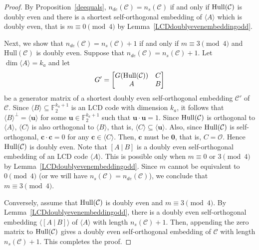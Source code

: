 \documentclass{article}
\theoremstyle{definition}
\theoremstyle{remark}
\begin{document}
\begin{proof}
By Proposition~\ref{deequals}, $n_{de}(\mathcal{C})=n_s(\mathcal{C})$ if and only if ${\rm{Hull}}(\mathcal{C})$ is doubly even and there is a shortest self-orthogonal embedding of $\langle A\rangle$ which is doubly even, that is $m\equiv 0\pmod 4$ by Lemma~\ref{LCDdoublyevenembeddingodd}.

Next, we show that $n_{de}(\mathcal{C})=n_s(\mathcal{C})+1$ if and only if $m\equiv 3\pmod 4$ and $\mathrm{Hull}(\mathcal{C})$ is doubly even. Suppose that $n_{de}(\mathcal{C})=n_s(\mathcal{C})+1$. Let $\dim\langle A\rangle=k_a$ and let
\[
    G'=\begin{bmatrix}G({\rm Hull}(\mathcal{C})) & C\\A & B \end{bmatrix}
\]
be a generator matrix of a shortest doubly even self-orthogonal embedding $\mathcal{C}'$ of $\mathcal{C}$. Since $\langle B\rangle\subseteq\mathbb{F}_2^{k_a+1}$ is an LCD code with dimension $k_a$, it follows that $\langle B\rangle^\perp=\langle \mathbf{u}\rangle$ for some $\mathbf{u}\in\mathbb{F}_2^{k_a+1}$ such that $\mathbf{u}\cdot\mathbf{u}=1$. Since ${\rm Hull}(\mathcal{C})$ is orthogonal to $\langle A\rangle$, $\langle C\rangle$ is also orthogonal to $\langle B\rangle$, that is, $\langle C\rangle\subseteq \langle \mathbf{u}\rangle$. Also, since ${\rm Hull}(\mathcal{C})$ is self-orthogonal, $\mathbf{c}\cdot\mathbf{c}=0$ for any $\mathbf{c}\in\langle C\rangle$. Then, $\mathbf{c}$ must be $\mathbf{0}$, that is, $C=\mathcal{O}$. Hence ${\rm Hull}(\mathcal{C})$ is doubly even. Note that $[A~|~B]$ is a doubly even self-orthogonal embedding of an LCD code $\langle A\rangle$. This is possible only when $m\equiv 0\mbox{ or }3\pmod 4$ by Lemma~\ref{LCDdoublyevenembeddingodd}. Since $m$ cannot be equivalent to $0\pmod 4$ (or we will have $n_s(\mathcal{C})=n_{de}(\mathcal{C})$), we conclude that $m\equiv 3\pmod 4$.

Conversely, assume that ${\rm{Hull}}(\mathcal{C})$ is doubly even and $m\equiv 3\pmod 4$. By Lemma~\ref{LCDdoublyevenembeddingodd}, there is a doubly even self-orthogonal embedding $\langle [A~|~B]\rangle$ of $\langle A\rangle$ with length $n_s(\mathcal{C})+1$. Then, appending the zero matrix to ${\rm{Hull}}(\mathcal{C})$ gives a doubly even self-orthogonal embedding of $\mathcal{C}$ with length $n_s(\mathcal{C})+1$. This completes the proof.
\end{proof}
\end{document}

